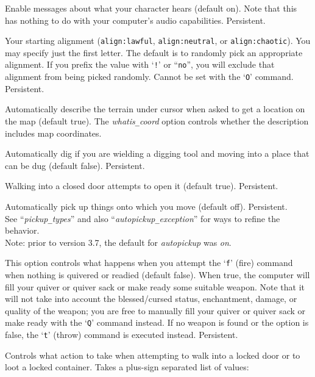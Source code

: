 \blist{}
\item[\ib{acoustics}]
Enable messages about what your character hears (default on).
Note that this has nothing to do with your computer's audio capabilities.
Persistent.
\item[\ib{align}]
Your starting alignment ({\tt align:lawful}, {\tt align:neutral},
or {\tt align:chaotic}).  You may specify just the first letter.
The default is to randomly pick an appropriate alignment.
If you prefix the value with `{\tt !}' or ``{\tt no}'', you will
exclude that alignment from being picked randomly.
Cannot be set with the `{\tt O}' command.  Persistent.
\item[\ib{autodescribe}]
Automatically describe the terrain under cursor when asked to get a location
on the map (default true).
The {\it whatis\verb+_+coord\/}
option controls whether the description includes map coordinates.
\item[\ib{autodig}]
Automatically dig if you are wielding a digging tool and moving into a place
that can be dug (default false).  Persistent.
\item[\ib{autoopen}]
Walking into a closed door attempts to open it (default true).
Persistent.
\item[\ib{autopickup}]
Automatically pick up things onto which you move (default off).
Persistent.
\\
See ``{\it pickup\verb+_+types\/}'' and also
``{\it autopickup\verb+_+exception\/}'' for ways to refine the behavior.
\\
Note: prior to version 3.7, the default for {\it autopickup\/} was {\it on}.
\item[\ib{autoquiver}]
This option controls what happens when you attempt the `{\tt f}' (fire)
command when nothing is quivered or readied (default false).
When true, the computer will fill
your quiver or quiver sack or make ready some suitable weapon.
Note that it will not take
into account the blessed/cursed status, enchantment, damage, or
quality of the weapon; you are free to manually fill your quiver
or quiver sack or make ready
with the `{\tt Q}' command instead.
If no weapon is found or the option is
false, the `{\tt t}' (throw) command is executed instead.  Persistent.
\item[\ib{autounlock}]
Controls what action to take when attempting to walk into a locked door
or to loot a locked container.
Takes a plus-sign separated list of values:
